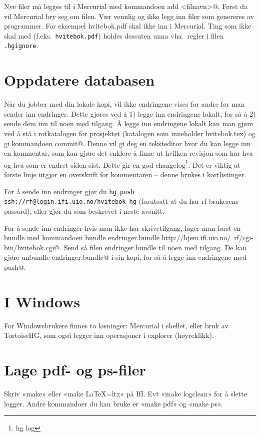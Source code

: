 \documentclass[11pt,norsk,a4paper,pointlessnumbers]{scrbook}
\begin{document}
Nye filer må legges til i Mercurial med kommandoen \verb@hg add <filnavn>@.
Først da vil Mercurial bry seg om filen. Vær vennlig og ikke legg inn filer
som genereres av programmer.
For eksempel hvitebok.pdf skal ikke inn i Mercurial.
Ting som ikke skal med (f.eks.~\verb|hvitebok.pdf|) holdes dessuten unna
vha.~regler i filen \verb|.hgignore|.

\section{Oppdatere databasen}
Når du jobber med din lokale kopi, vil ikke endringene vises for andre før man
sender inn endringer. Dette gjøres ved å 1) legge inn endringene lokalt, for så
å 2) sende dem inn til noen med tilgang. Å legge inn endringene lokalt kan man 
gjøre ved å stå i rotkatalogen for prosjektet (katalogen som inneholder
hvitebok.tex) og gi kommandoen \verb@hg commit@. Denne vil gi deg en
teksteditor hvor du kan legge inn en kommentar, som kan gjøre det enklere å
finne ut hvilken revisjon som har hva og hva som er endret siden sist.
Dette gir en god changelog\footnote{hg log}.
Det er viktig at første linje utgjør en overskrift for kommentaren -- denne
brukes i kortlistinger.

For å sende inn endringer gjør du
\verb|hg push ssh://rf@login.ifi.uio.no/hvitebok-hg|
(forutsatt at du har rf-brukerens passord), eller gjør du som beskrevet i neste
avsnitt.

For å sende inn endringer hvis man ikke har skrivetilgang, lager man først en
bundle med kommandoen
\verb@hg bundle endringer.bundle http://hjem.ifi.uio.no/~rf/cgi-bin/hvitebok.cgi@.
Send så filen endringer.bundle til noen med tilgang. De kan gjøre
\verb@hg unbundle endringer.bundle@ i sin kopi, for så å legge inn endringene
med \verb@hg push@.

\section{I Windows}
For Windowsbrukere finnes to løsninger: Mercurial i shellet, eller bruk av TortoiseHG,
som også legger inn operasjoner i explorer (høyreklikk).

\section{Lage pdf- og ps-filer}
Skriv «make» eller «make LaTeX=ltx» på IfI.
Evt «make logclean» for å slette logger.
Andre kommandoer du kan bruke er «make pdf» og «make ps».
\end{document}
